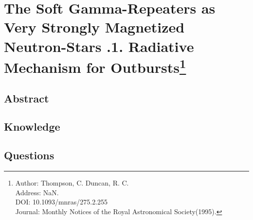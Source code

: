 \section[The Soft Gamma-Repeaters as Very Strongly Magnetized Neutron-Stars .1. Radiative Mechanism for Outbursts]{The Soft Gamma-Repeaters as Very Strongly Magnetized Neutron-Stars .1. Radiative Mechanism for Outbursts\protect\footnote{Author: Thompson, C. Duncan, R. C. \\Address: NaN. \\DOI: 10.1093/mnras/275.2.255 \\Journal: Monthly Notices of the Royal Astronomical Society(1995).}}
\subsection{Abstract}

\subsection{Knowledge}

\subsection{Questions}